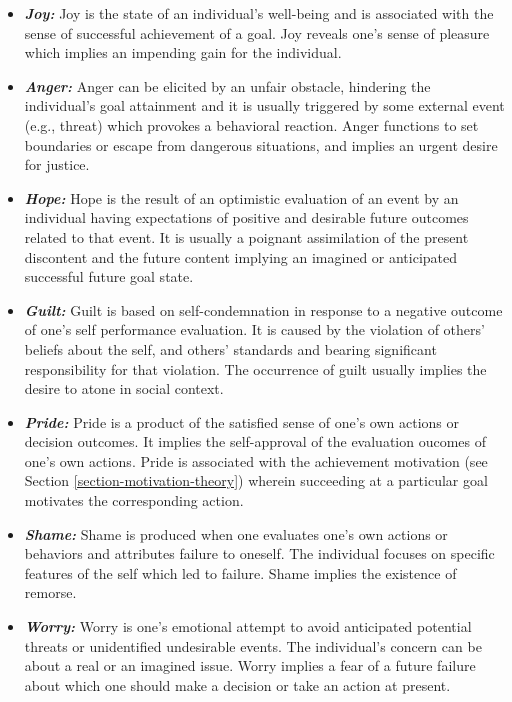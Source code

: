 \documentclass[12pt]{report}
\begin{document}
\begin{itemize}
  \item \textbf{\textit{Joy:}} Joy is the state of an individual's well-being
  and is associated with the sense of successful achievement of a goal. Joy
  reveals one's sense of pleasure which implies an impending gain for the
  individual.
  
  \item \textbf{\textit{Anger:}} Anger can be elicited by an unfair obstacle,
  hindering the individual's goal attainment and it is usually triggered by some
  external event (e.g., threat) which provokes a behavioral reaction. Anger
  functions to set boundaries or escape from dangerous situations, and implies
  an urgent desire for justice.
  
  \item \textbf{\textit{Hope:}} Hope is the result of an optimistic evaluation
  of an event by an individual having expectations of positive and desirable
  future outcomes related to that event. It is usually a poignant assimilation
  of the present discontent and the future content implying an imagined or
  anticipated successful future goal state.
  
  \item \textbf{\textit{Guilt:}} Guilt is based on self-condemnation in response
  to a negative outcome of one's self performance evaluation. It is caused by
  the violation of others' beliefs about the self, and others' standards and
  bearing significant responsibility for that violation. The occurrence of
  guilt usually implies the desire to atone in social context.
  
  \item \textbf{\textit{Pride:}} Pride is a product of the satisfied sense of
  one's own actions or decision outcomes. It implies the self-approval of the
  evaluation oucomes of one's own actions. Pride is associated with the
  achievement motivation (see Section \ref{section-motivation-theory}) wherein
  succeeding at a particular goal motivates the corresponding action.
  
  \item \textbf{\textit{Shame:}} Shame is produced when one evaluates one's own
  actions or behaviors and attributes failure to oneself. The individual focuses
  on specific features of the self which led to failure. Shame implies the
  existence of remorse.
  
  \item \textbf{\textit{Worry:}} Worry is one's emotional attempt to avoid
  anticipated potential threats or unidentified undesirable events. The
  individual's concern can be about a real or an imagined issue. Worry implies a
  fear of a future failure about which one should make a decision or take an
  action at present.
\end{itemize}
\end{document}
